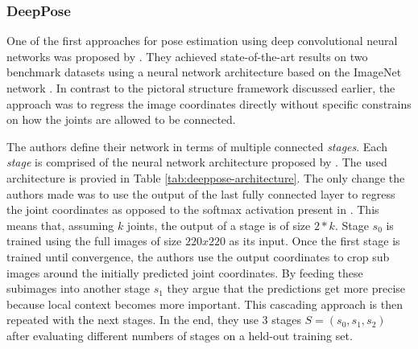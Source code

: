 \subsubsection{DeepPose}
One of the first approaches for pose estimation using deep convolutional neural networks was proposed by \cite{toshev_deeppose:_2014}.
They achieved state-of-the-art results on two benchmark datasets using a neural network architecture based on the ImageNet network \cite{krizhevsky_imagenet_2012}.
In contrast to the pictoral structure framework discussed earlier, the approach was to regress the image coordinates directly without specific constrains on how the joints are allowed to be connected.

The authors define their network in terms of multiple connected \textit{stages}.
Each \textit{stage} is comprised of the neural network architecture proposed by \cite{krizhevsky_imagenet_2012}.
The used architecture is provied in Table \ref{tab:deeppose-architecture}.
The only change the authors made was to use the output of the last fully connected layer to regress the joint coordinates as opposed to the softmax activation present in \cite{krizhevsky_imagenet_2012}.
This means that, assuming $k$ joints, the output of a stage is of size $2 * k$.
Stage $s_0$ is trained using the full images of size $220 x 220$ as its input.
Once the first stage is trained until convergence, the authors use the output coordinates to crop sub images around the initially predicted joint coordinates.
By feeding these subimages into another stage $s_1$ they argue that the predictions get more precise because local context becomes more important.
This cascading approach is then repeated with the next stages.
In the end, they use $3$ stages $S = (s_0, s_1, s_2)$ after evaluating different numbers of stages on a held-out training set.

